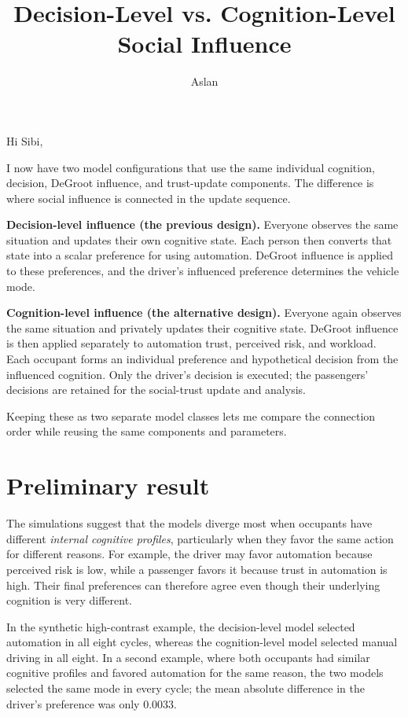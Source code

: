 \documentclass[11pt]{article}
\title{Decision-Level vs. Cognition-Level Social Influence}
\author{Aslan}
\date{}
\begin{document}
\maketitle

Hi Sibi,

I now have two model configurations that use the same individual cognition,
decision, DeGroot influence, and trust-update components.  The difference is
where social influence is connected in the update sequence.

\textbf{Decision-level influence (the previous design).}
Everyone observes the same situation and updates their own cognitive state.
Each person then converts that state into a scalar preference for using
automation.  DeGroot influence is applied to these preferences, and the
driver's influenced preference determines the vehicle mode.

\textbf{Cognition-level influence (the alternative design).}
Everyone again observes the same situation and privately updates their
cognitive state.  DeGroot influence is then applied separately to automation
trust, perceived risk, and workload.  Each occupant forms an individual
preference and hypothetical decision from the influenced cognition.  Only the
driver's decision is executed; the passengers' decisions are retained for the
social-trust update and analysis.

Keeping these as two separate model classes lets me compare the connection
order while reusing the same components and parameters.

\section*{Preliminary result}

The simulations suggest that the models diverge most when occupants have
different \emph{internal cognitive profiles}, particularly when they favor the
same action for different reasons.  For example, the driver may favor
automation because perceived risk is low, while a passenger favors it because
trust in automation is high.  Their final preferences can therefore agree even
though their underlying cognition is very different.

In the synthetic high-contrast example, the decision-level model selected
automation in all eight cycles, whereas the cognition-level model selected
manual driving in all eight.  In a second example, where both occupants had
similar cognitive profiles and favored automation for the same reason, the two
models selected the same mode in every cycle; the mean absolute difference in
the driver's preference was only 0.0033.
\end{document}
